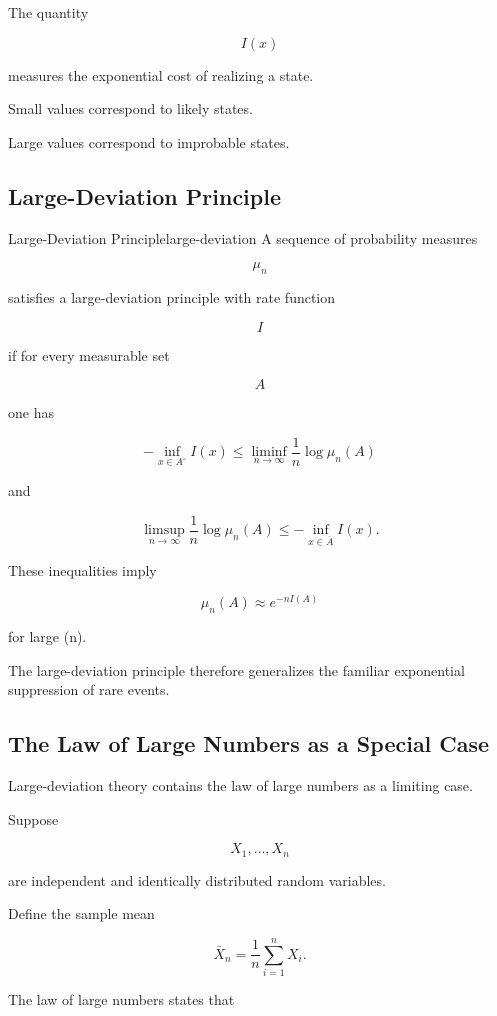 \documentclass[12pt,twoside,openright]{book}
\begin{document}
The quantity

\[
I(x)
\]

measures the exponential cost of realizing a state.

Small values correspond to likely states.

Large values correspond to improbable states.

\subsection{Large-Deviation Principle}

\begin{definition}{Large-Deviation Principle}{large-deviation}
A sequence of probability measures

\[
{\mu_n}
\]

satisfies a large-deviation principle with rate function

\[
I
\]

if for every measurable set

\[
A
\]

one has

\[
-\inf_{x\in A^\circ}
I(x)
\le
\liminf_{n\to\infty}
\frac1n
\log\mu_n(A)
\]

and

\[
\limsup_{n\to\infty}
\frac1n
\log\mu_n(A)
\le
-\inf_{x\in\overline A}
I(x).
\]
\end{definition}

These inequalities imply

\[
\mu_n(A)
\approx
e^{-nI(A)}
\]

for large (n).

The large-deviation principle therefore generalizes the
familiar exponential suppression of rare events.

\subsection{The Law of Large Numbers as a Special Case}

Large-deviation theory contains the law of large numbers
as a limiting case.

Suppose

\[
X_1,\ldots,X_n
\]

are independent and identically distributed random
variables.

Define the sample mean

\[
\bar X_n
=
\frac1n
\sum_{i=1}^{n}
X_i.
\]

The law of large numbers states that
\end{document}
